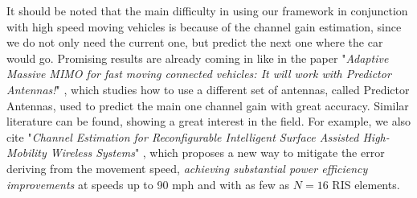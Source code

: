 It should be noted that the main difficulty in using our framework in conjunction with high speed moving vehicles is because of the channel gain estimation, since we do not only need the current one, but predict the next one where the car would go. Promising results are already coming in like in the paper "\textit{Adaptive Massive MIMO for fast moving connected vehicles: It will work with Predictor Antennas!}" \cite{8385489}, which studies how to use a different set of antennas, called Predictor Antennas, used to predict the main one channel gain with great accuracy. Similar literature can be found, showing a great interest in the field. For example, we also cite "\textit{Channel Estimation for Reconfigurable Intelligent Surface Assisted High-Mobility Wireless Systems}" \cite{9875062}, which proposes a new way to mitigate the error deriving from the movement speed, \textit{achieving substantial power efficiency improvements} at speeds up to 90 mph and with as few as $N=16$ RIS elements.